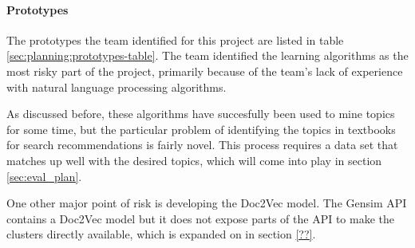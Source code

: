 
\paragraph{Prototypes}
\label{sec:planning}
The prototypes the team identified for this project are listed in
table \ref{sec:planning:prototypes-table}.
The team identified the learning algorithms as the most risky part of
the project, primarily because of the team's lack of experience
with natural language processing algorithms.  

As discussed before, these algorithms have succesfully been used to
mine topics for some time, but the particular problem of identifying
the topics in textbooks for search recommendations is fairly novel.
This process requires a data set that matches up well with the desired
topics, which will come into play in section \ref{sec:eval_plan}.

One other major point of risk is developing the Doc2Vec model.
The Gensim API contains a Doc2Vec model but it does not expose parts
of the API to make the clusters directly available, which is expanded
on in section \ref{??}.


